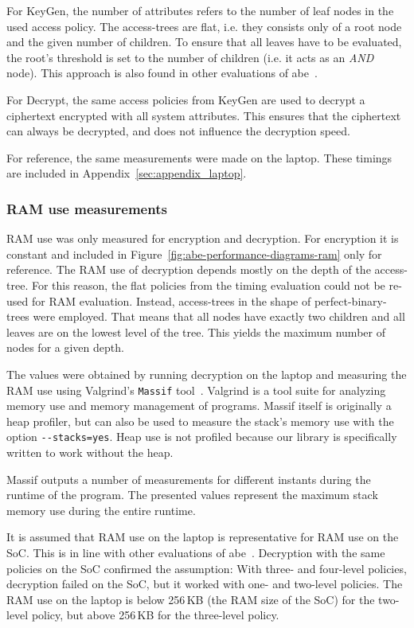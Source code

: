 For KeyGen, the number of attributes refers to the number of leaf nodes in the used access policy.
The \glspl{access-tree} are flat, i.e. they consists only of a root node and the given number of children.
To ensure that all leaves have to be evaluated, the root's threshold is set to the number of children (i.e. it acts as an \emph{AND} node).
This approach is also found in other evaluations of \acrshort{abe}~\cite{girgenti_feasibility_2019}.

For Decrypt, the same access policies from KeyGen are used to decrypt a ciphertext encrypted with all system attributes.
This ensures that the ciphertext can always be decrypted, and does not influence the decryption speed.

For reference, the same measurements were made on the laptop.
These timings are included in Appendix~\ref{sec:appendix_laptop}.

\subsubsection{RAM use measurements}


RAM use was only measured for encryption and decryption. 
For encryption it is constant and included in Figure~\ref{fig:abe-performance-diagrams-ram} only for reference.
The RAM use of decryption depends mostly on the depth of the \gls{access-tree}.
For this reason, the flat policies from the timing evaluation could not be re-used for RAM evaluation.
Instead, \glspl{access-tree} in the shape of \glspl{perfect-binary-tree} were employed.
That means that all nodes have exactly two children and all leaves are on the lowest level of the tree.
This yields the maximum number of nodes for a given depth.

The values were obtained by running decryption on the laptop and measuring the RAM use using Valgrind's \texttt{Massif} tool~\cite{nethercote_massif_nodate}.
Valgrind is a tool suite for analyzing memory use and memory management of programs.
Massif itself is originally a heap profiler, but can also be used to measure the stack's memory use with the option \verb+--stacks=yes+.
Heap use is not profiled because our library is specifically written to work without the heap.

Massif outputs a number of measurements for different instants during the runtime of the program. 
The presented values represent the maximum stack memory use during the entire runtime.

It is assumed that RAM use on the laptop is representative for RAM use on the SoC.
This is in line with other evaluations of \acrshort{abe}~\cite{borgh_attribute-based_2016}. 
Decryption with the same policies on the SoC confirmed the assumption:
With three- and four-level policies, decryption failed on the SoC, but it worked with one- and two-level policies.
The RAM use on the laptop is below 256\,KB (the RAM size of the SoC) for the two-level policy, but above 256\,KB for the three-level policy.

